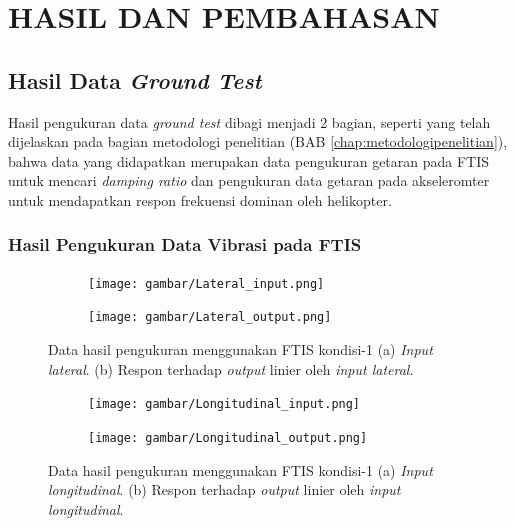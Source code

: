 \chapter{HASIL DAN PEMBAHASAN}
\label{chap:hasil dan pembahasan}

\thispagestyle{newchap}

\section{Hasil Data \textit{Ground Test}}
Hasil pengukuran data \textit{ground test} dibagi menjadi 2 bagian, seperti yang telah dijelaskan pada bagian metodologi penelitian (BAB \ref{chap:metodologipenelitian}), bahwa data yang didapatkan merupakan data pengukuran getaran pada FTIS untuk mencari \textit{damping ratio} dan pengukuran data getaran pada akseleromter untuk mendapatkan respon frekuensi dominan oleh helikopter.

\subsection{Hasil Pengukuran Data Vibrasi pada FTIS}
\label{FTIS}

\begin{figure}[H]
	\begin{subfigure}{0.45\textwidth}
		\centering
		\texttt{[image: gambar/Lateral\_input.png]}
		\caption{}
		\label{fig:Lateral_input}
	\end{subfigure}
	\centering
	\begin{subfigure}{0.45\textwidth}
		\centering
		\texttt{[image: gambar/Lateral\_output.png]}
		\caption{}
		\label{fig:Lateral_output}
	\end{subfigure}
	\caption{Data hasil pengukuran menggunakan FTIS kondisi-1 (a) \textit{Input lateral}. (b) Respon terhadap \textit{output} linier oleh \textit{input lateral}.}
	\label{fig:io_lat}
\end{figure}

\begin{figure}[H]
	\begin{subfigure}{0.45\textwidth}
		\centering
		\texttt{[image: gambar/Longitudinal\_input.png]}
		\caption{}
		\label{fig:Longitudinal_input}
	\end{subfigure}
	\centering
	\begin{subfigure}{0.45\textwidth}
		\centering
		\texttt{[image: gambar/Longitudinal\_output.png]}
		\caption{}
		\label{fig:Longitudinal_output}
	\end{subfigure}
	\caption{Data hasil pengukuran menggunakan FTIS kondisi-1 (a) \textit{Input longitudinal}. (b) Respon terhadap \textit{output} linier oleh \textit{input longitudinal}.}
	\label{fig:io_long}
\end{figure}

